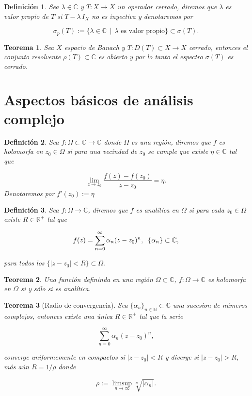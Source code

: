 \documentclass[letterpaper]{report}
\newtheorem{teorema}{Teorema}[chapter]
\newtheorem{def.}{Definici\'on}[chapter]
\newcommand{\nat}{\ensuremath{ \mathbb N }}
\newcommand{\co}{\ensuremath{\mathbb C }}
\newcommand{\re}{\ensuremath{\mathbb R }}
\begin{document}
\begin{def.}
Sea $\lambda\in\co$ y $T:X\rightarrow X$ un operador cerrado, diremos que $\lambda$ es valor propio de $T$ si $T-\lambda\,I_X$ no es inyectiva y denotaremos por

$$\sigma_p(T):=\lbrace\lambda\in\co\,\mid\,\lambda\text{ es valor propio}\rbrace\subset\sigma(T).$$
\end{def.}

\begin{teorema}
Sea $X$ espacio de Banach y $T:D(T)\subset X\rightarrow X$ cerrado, entonces el conjunto resolvente $\rho(T)\subset\co$ es abierto y por lo tanto el espectro $\sigma(T)$ es cerrado.
\end{teorema}

\section{Aspectos básicos de análisis complejo}
\begin{def.}
Sea $f:\Omega\subset\co\rightarrow\co$ donde $\Omega$ es una región, diremos que $f$ es holomorfa en $z_0\in\Omega$ si para una vecindad de $z_0$ se cumple que existe $\eta\in\co$ tal que

\begin{equation}\label{holomorfa}
\lim_{z\rightarrow z_0}\frac{f(z)-f(z_0)}{z-z_0}=\eta.
\end{equation}
Denotaremos por $f'(z_0):=\eta$ 
\end{def.}

\begin{def.}
Sea $f:\Omega\rightarrow\co$, diremos que $f$ es analítica en $\Omega$ si para cada $z_0\in\Omega$ existe $R\in\re^{+}$ tal que

$$f(z)=\sum^{\infty}_{n=0}\alpha_n(z-z_0)^n,\hspace{0.2cm}\lbrace\alpha_n\rbrace\subset\co,$$

para todos los $\lbrace\vert z-z_0\vert<R\rbrace\subset\Omega.$  
\end{def.}

\begin{teorema}
Una función defininda en una región $\Omega\subset\co$, $f:\Omega
\rightarrow\co$ es holomorfa en $\Omega$ si y sólo si es analítica.
\end{teorema}

\begin{teorema}[Radio de convergencia]\label{radio-conver}
Sea $\lbrace\alpha_n\rbrace_{n\in\nat}\subset\co$ una sucesion de números complejos, entonces existe una única $R\in\re^+$ tal que la serie

$$\sum^{\infty}_{n=0}\alpha_n(z-z_0)^n,$$

converge uniformemente en compactos si $\vert z-z_0\vert<R$ y diverge si $\vert z-z_0\vert>R$, más aún $R=1/\rho$ donde

$$\rho:=\limsup_{n\rightarrow\infty}\sqrt[n]{\vert\alpha_n\vert}.$$ 
\end{teorema}
\end{document}
